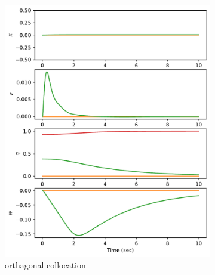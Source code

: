 \documentclass[]{article}
\begin{document}
\begin{figure}[H]
	\centering
	\begin{subfigure}[b]{0.3\textwidth}
		\centering
		\includegraphics[width=\textwidth]{figures/state45dz1.pdf}
		\caption{orthagonal collocation}
	\end{subfigure}%
	\begin{subfigure}[b]{0.3\textwidth}
		\centering

\end{subfigure}
\end{figure}
\end{document}
